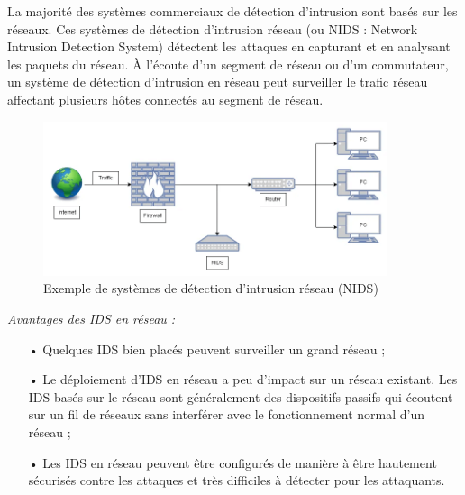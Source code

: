 \vspace{0.5em}

La majorité des systèmes commerciaux de détection d'intrusion sont basés sur les réseaux. Ces systèmes de détection d'intrusion réseau (ou NIDS : Network Intrusion Detection System) détectent les attaques en capturant et en analysant les paquets du réseau. À l'écoute d'un segment de réseau ou d'un commutateur, un système de détection d'intrusion en réseau peut surveiller le trafic réseau affectant plusieurs hôtes connectés au segment de réseau.\\

\newpage

\begin{figure}[h]%
    \center%
    \includegraphics[width=0.9\textwidth]{assets/NIDS.png}
    \caption[Exemple de systèmes de détection d'intrusion réseau (NIDS) (source: \href{https://miro.medium.com/v2/resize:fit:4800/format:webp/1*Jbw1iMzBztCaUokJnqePBg.png}{techno-skills.com})]{Exemple de systèmes de détection d'intrusion réseau (NIDS)}\label{fig:NIDSexemple}
\end{figure}

\vspace{1em}

\textit{Avantages des IDS en réseau :}\\

\begin{itemize}[itemsep=1em]
    \item[•] Quelques IDS bien placés peuvent surveiller un grand réseau ;
    \item[•] Le déploiement d'IDS en réseau a peu d'impact sur un réseau existant. Les IDS basés sur le réseau sont généralement des dispositifs passifs qui écoutent sur un fil de réseaux sans interférer avec le fonctionnement normal d'un réseau ;
    \item[•] Les IDS en réseau peuvent être configurés de manière à être hautement sécurisés contre les attaques et très difficiles à détecter pour les attaquants.\\
\end{itemize}

